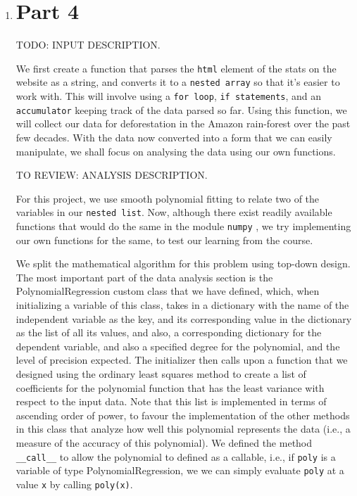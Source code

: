 \documentclass[12pt]{article}
\begin{document}
\begin{enumerate}
\item \section*{Part 4}

\begin{text}

TODO: INPUT DESCRIPTION.

We first create a function that parses the \texttt{html} element of the stats on the website as a string, and converts it to a \texttt{nested array} so that it’s easier to work with. This will involve using a \texttt{for loop}, \texttt{if statements}, and an \texttt{accumulator} keeping track of the data parsed so far. Using this function, we will collect our data for deforestation in the Amazon rain-forest over the past few decades. With the data now converted into a form that we can easily manipulate, we shall focus on analysing the data using our own functions.


TO REVIEW: ANALYSIS DESCRIPTION.

For this project, we use smooth polynomial fitting to relate two of the variables in our \texttt{nested list}. Now, although there exist readily available functions that would do the same in the module \texttt{numpy} \citep{Sci20}, we try implementing our own functions for the same, to test our learning from the course.

We split the mathematical algorithm for this problem using top-down design. The most important part of the data analysis section is the PolynomialRegression custom class that we have defined, which, when initializing a variable of this class, takes in a dictionary with the name of the independent variable as the key, and its corresponding value in the dictionary as the list of all its values, and also, a corresponding dictionary for the dependent variable, and also a specified degree for the polynomial, and the level of precision expected. The initializer then calls upon a function that we designed using the ordinary least squares method to create a list of coefficients for the polynomial function that has the least variance with respect to the input data. Note that this list is implemented in terms of ascending order of power, to favour the implementation of the other methods in this class that analyze how well this polynomial represents the data (i.e., a measure of the accuracy of this polynomial). We defined the method \texttt{\_\_call\_\_} to allow the polynomial to defined as a callable, i.e., if \texttt{poly} is a variable of type PolynomialRegression, we we can simply evaluate \texttt{poly} at a value \texttt{x} by calling \texttt{poly(x)}.


\end{text}
\end{enumerate}
\end{document}
